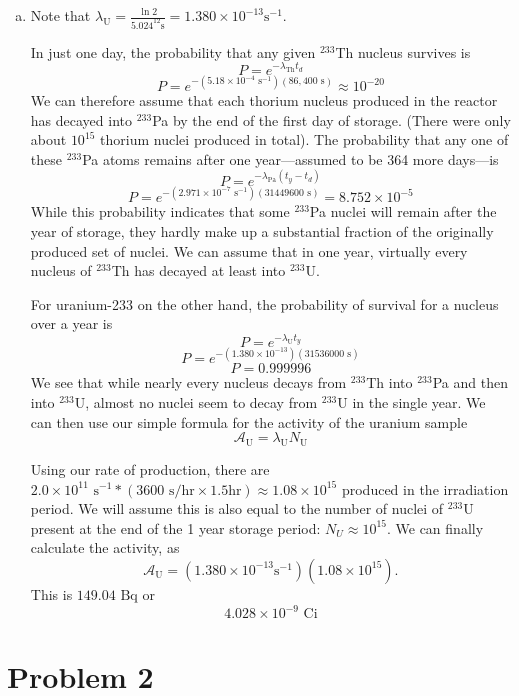 \documentclass{report}
\begin{document}
\begin{enumerate}[a)]
\item 

Note that $\lambda_{\text{U}} = \frac{\ln 2}{5.024^{12}\text{s}} = 1.380\times10^{-13}\text{s}^{-1}$. 

In just one day, the probability that any given $^{233}$Th nucleus survives is
$$ P = e^{-\lambda_{\text{Th}}t_d} $$
$$ P = e^{-(5.18\times10^{-4}\text{ s}^{-1})(86,400\text{ s})} \approx 10^{-20} $$
We can therefore assume that each thorium nucleus produced in the reactor has decayed into $^{233}$Pa by the end of the first day of storage. (There were only about $10^{15}$ thorium nuclei produced in total).
The probability that any one of these $^{233}$Pa atoms remains after one year---assumed to be 364 more days---is
$$ P = e^{-\lambda_{\text{Pa}}(t_y-t_d)} $$
$$ P = e^{-(2.971\times10^{-7}\text{ s}^{-1})(31449600\text{ s})} = 8.752\times10^{-5}  $$
While this probability indicates that some $^{233}$Pa nuclei will remain after the year of storage, they hardly make up a substantial fraction of the originally produced set of nuclei. We can assume that in one year, virtually every nucleus of $^{233}$Th has decayed at least into $^{233}$U.  

For uranium-233 on the other hand, the probability of survival for a nucleus over a year is
$$ P = e^{-\lambda_{\text{U}}t_y} $$
$$ P = e^{-(1.380\times10^{-13})(31536000\text{ s})} $$
$$ P = 0.999996 $$
We see that while nearly every nucleus decays from $^{233}$Th into $^{233}$Pa and then into $^{233}$U, almost no nuclei seem to decay from $^{233}$U in the single year.
We can then use our simple formula for the activity of the uranium sample
$$ \mathcal{A}_{\text{U}} = \lambda_{\text{U}} N_{\text{U}}$$

Using our rate of production, there are $2.0\times10^{11}\text{ s}^{-1}*(3600\text{ s/hr}\times 1.5 \text{hr}) \approx 1.08\times10^{15}$ produced in the irradiation period. We will assume this is also equal to the number of nuclei of $^{233}$U present at the end of the 1 year storage period: $N_U \approx 10^{15}$. We can finally calculate the activity, as 
$$ \mathcal{A}_{\text{U}} = (1.380\times10^{-13}\text{s}^{-1})(1.08\times10^{15}) .$$
This is ${149.04}\text{ Bq}$ or 
$$\boxed{ 4.028\times10^{-9}\text{ Ci} }$$
\end{enumerate}


\newpage
\section*{Problem 2}
\end{document}
